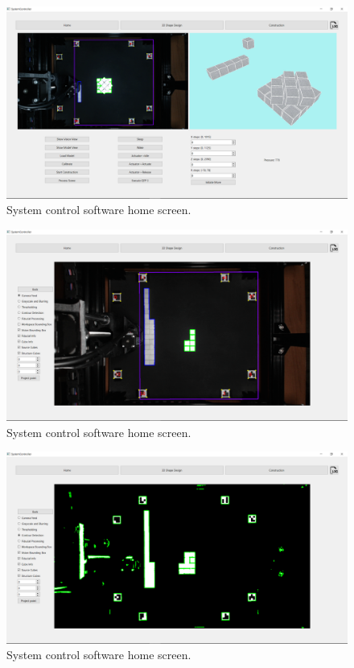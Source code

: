 \begin{figure}[!ht]
	\centering
	\includegraphics[width=1\linewidth]{figures/gui-construction-view2.png}
	\caption{System control software home screen.}
	\label{fig:gui-construction-view}
\end{figure}

\begin{figure}[!ht]
	\centering
	\includegraphics[width=1\linewidth]{figures/gui-vision-view.png}
	\caption{System control software home screen.}
	\label{fig:gui-vision-view}
\end{figure}

\begin{figure}[!ht]
	\centering
	\includegraphics[width=1\linewidth]{figures/gui-vision-view-contour.png}
	\caption{System control software home screen.}
	\label{fig:gui-vision-view-contour}
\end{figure}

